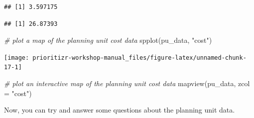 \documentclass[
  12pt,
]{book}
\newenvironment{Shaded}{\begin{snugshade}}{\end{snugshade}}
\newcommand{\AttributeTok}[1]{\textcolor[rgb]{0.77,0.63,0.00}{#1}}
\newcommand{\CommentTok}[1]{\textcolor[rgb]{0.56,0.35,0.01}{\textit{#1}}}
\newcommand{\FunctionTok}[1]{\textcolor[rgb]{0.00,0.00,0.00}{#1}}
\newcommand{\NormalTok}[1]{#1}
\newcommand{\SpecialCharTok}[1]{\textcolor[rgb]{0.00,0.00,0.00}{#1}}
\newcommand{\StringTok}[1]{\textcolor[rgb]{0.31,0.60,0.02}{#1}}
\begin{document}
\begin{Shaded}
\end{Shaded}

\begin{verbatim}
## [1] 3.597175
\end{verbatim}

\begin{Shaded}
\end{Shaded}

\begin{verbatim}
## [1] 26.87393
\end{verbatim}

\begin{Shaded}
\begin{Highlighting}[]
\CommentTok{\# plot a map of the planning unit cost data}
\FunctionTok{spplot}\NormalTok{(pu\_data, }\StringTok{"cost"}\NormalTok{)}
\end{Highlighting}
\end{Shaded}

\begin{center}\texttt{[image: prioritizr-workshop-manual\_files/figure-latex/unnamed-chunk-17-1]} \end{center}

\begin{Shaded}
\begin{Highlighting}[]
\CommentTok{\# plot an interactive map of the planning unit cost data}
\FunctionTok{mapview}\NormalTok{(pu\_data, }\AttributeTok{zcol =} \StringTok{"cost"}\NormalTok{)}
\end{Highlighting}
\end{Shaded}

Now, you can try and answer some questions about the planning unit data.
\end{document}
